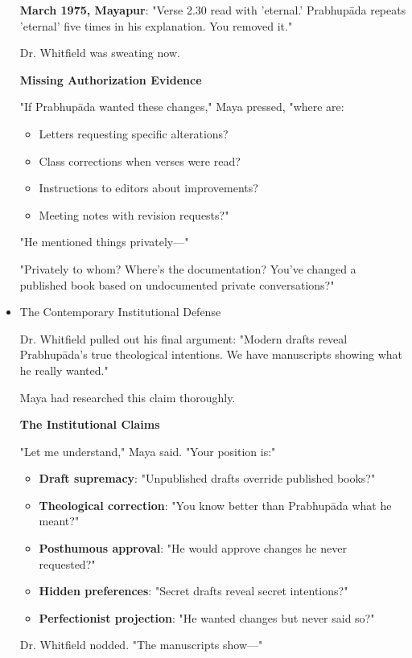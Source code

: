 \documentclass[11pt,twoside]{book}
\begin{document}
\begin{itemize}
\textbf{\textbf{March 1975, Mayapur}}: "Verse 2.30 read with 'eternal.' Prabhupāda repeats 'eternal' five times in his explanation. You removed it."

Dr. Whitfield was sweating now.

\textbf{\textbf{Missing Authorization Evidence}}

"If Prabhupāda wanted these changes," Maya pressed, "where are:
\begin{itemize}
\item Letters requesting specific alterations?
\item Class corrections when verses were read?
\item Instructions to editors about improvements?
\item Meeting notes with revision requests?"
\end{itemize}

"He mentioned things privately—"

"Privately to whom? Where's the documentation? You've changed a published book based on undocumented private conversations?"
\item The Contemporary Institutional Defense
\label{sec:org389ef5e}

Dr. Whitfield pulled out his final argument: "Modern drafts reveal Prabhupāda's true theological intentions. We have manuscripts showing what he really wanted."

Maya had researched this claim thoroughly.

\textbf{\textbf{The Institutional Claims}}

"Let me understand," Maya said. "Your position is:"

\begin{itemize}
\item \textbf{\textbf{Draft supremacy}}: "Unpublished drafts override published books?"
\item \textbf{\textbf{Theological correction}}: "You know better than Prabhupāda what he meant?"
\item \textbf{\textbf{Posthumous approval}}: "He would approve changes he never requested?"
\item \textbf{\textbf{Hidden preferences}}: "Secret drafts reveal secret intentions?"
\item \textbf{\textbf{Perfectionist projection}}: "He wanted changes but never said so?"
\end{itemize}

Dr. Whitfield nodded. "The manuscripts show—"


\end{itemize}
\end{document}
